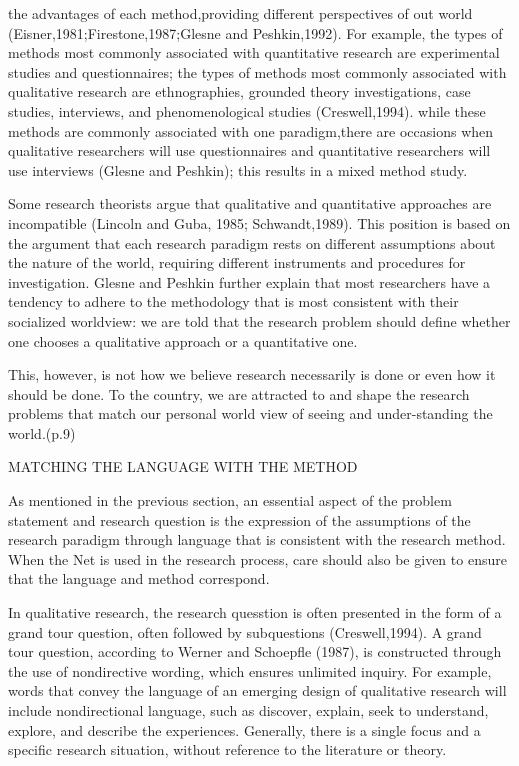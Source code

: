 \documentclass[12pt]{beamer}
\begin{document}
\begin{frame}
the advantages of each method,providing different perspectives of out world (Eisner,1981;Firestone,1987;Glesne and Peshkin,1992). For example, the types of methods most commonly associated with quantitative research are experimental studies and questionnaires; the types of methods most commonly associated with qualitative research are ethnographies, grounded theory investigations, case studies, interviews, and phenomenological studies (Creswell,1994).
while these methods are commonly associated with one paradigm,there are occasions when qualitative researchers will use questionnaires and quantitative researchers will use interviews (Glesne and Peshkin); this results in a mixed method study.
\end{frame}
\begin{frame}
 Some research theorists argue that qualitative and quantitative approaches are incompatible (Lincoln and Guba, 1985; Schwandt,1989). This position is based on the argument that each research paradigm rests on different assumptions about the nature of the world, requiring different instruments and procedures for investigation. Glesne and Peshkin further explain that most researchers have a tendency to adhere to the methodology that is most consistent with their socialized worldview:
we are told that the research problem should define whether one chooses a qualitative approach or a quantitative one.
\end{frame}
 \begin{frame}
 This, however, is not how we believe research necessarily is done or even how it should be done. To the country, we are attracted to and shape the research problems that match our personal world view of seeing and under-standing the world.(p.9)


MATCHING THE LANGUAGE WITH THE METHOD


 As mentioned in the previous section, an essential aspect of the problem statement and research question is the expression of the assumptions of the research paradigm through language that is consistent with the research method. When the Net is used in the research process, care should also be given to ensure that the language and method correspond.
\end{frame}
 \begin{frame}
  In qualitative research, the research quesstion is often presented in the form of a grand tour question, often followed by subquestions (Creswell,1994). A grand tour question, according to Werner and Schoepfle (1987), is constructed through the use of nondirective wording, which ensures unlimited inquiry. For example, words that convey the language of an emerging design of qualitative research will include nondirectional language, such as discover, explain, seek to understand, explore, and describe the experiences.
 Generally, there is a single focus and a specific research situation, without reference to the literature or theory.
\end{frame}
\end{document}
